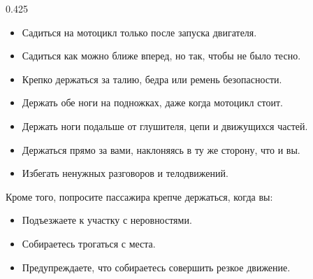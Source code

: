 \begin{langblock}{0.425}
\begin{rus}
		\begin{itemize}[noitemsep, nosep]
			\item Садиться на мотоцикл только после запуска двигателя.
			\item Садиться как можно ближе вперед, но так, чтобы не было тесно.
			\item Крепко держаться за талию, бедра или ремень безопасности.
			\item Держать обе ноги на подножках, даже когда мотоцикл стоит.
			\item Держать ноги подальше от глушителя, цепи и движущихся частей.
			\item Держаться прямо за вами, наклоняясь в ту же сторону, что и вы.
			\item Избегать ненужных разговоров и телодвижений. 
		\end{itemize}	
		
		\medskip
		Кроме того, попросите пассажира крепче держаться, когда вы:
		\begin{itemize}[noitemsep, nosep]
			\item Подъезжаете к участку с неровностями.
			\item Собираетесь трогаться с места.
			\item Предупреждаете, что собираетесь совершить резкое движение.
		\end{itemize}
\end{rus}
\end{langblock}





